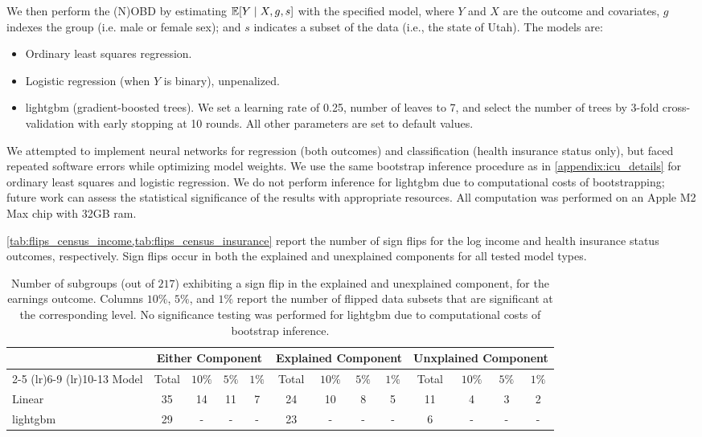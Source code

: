 We then perform the (N)OBD by estimating $\mathbb{E}[Y \mid X, g, s]$ with the specified model, 
where \( Y \) and \( X \) are the outcome and covariates, 
\( g \) indexes the group (i.e. male or female sex);
and \( s \) indicates a subset of the data (i.e., the state of Utah).
The models are:
\begin{itemize}
    \item Ordinary least squares regression.
    \item Logistic regression (when $Y$ is binary), unpenalized.
    \item lightgbm (gradient-boosted trees). We set a learning rate of 0.25, number of leaves to 7, and select the number of trees by 3-fold cross-validation with early stopping at 10 rounds. All other parameters are set to default values.
\end{itemize}
We attempted to implement neural networks for regression (both outcomes) and classification (health insurance status only), but faced repeated software errors while optimizing model weights.
We use the same bootstrap inference procedure as in \cref{appendix:icu_details} for ordinary least squares and logistic regression. 
We do not perform inference for lightgbm due to computational costs of bootstrapping; future work can assess the statistical significance of the results with appropriate resources.
All computation was performed on an Apple M2 Max chip with 32GB ram.

\cref{tab:flips_census_income,tab:flips_census_insurance} report the number of sign flips for the log income and health insurance status outcomes, respectively.
Sign flips occur in both the explained and unexplained components for all tested model types.

\begin{table}[!ht]
    \caption{Number of subgroups (out of $217$) exhibiting a sign flip in the explained and unexplained component, for the earnings outcome. Columns $10\%$, $5\%$, and $1\%$ report the number of flipped data subsets that are significant at the corresponding level. No significance testing was performed for lightgbm due to computational costs of bootstrap inference.}
    \label{tab:flips_census_income}
    \centering
    \small
    \begin{tabular}{l*{12}{c}}
    \toprule
          & \multicolumn{4}{c}{Either Component} & \multicolumn{4}{c}{Explained Component} & \multicolumn{4}{c}{Unxplained Component} \\
          \cmidrule(lr){2-5} \cmidrule(lr){6-9} \cmidrule(lr){10-13}
    Model       & Total & $10\%$ & $5\%$ & $1\%$ & Total & $10\%$ & $5\%$ & $1\%$ & Total & $10\%$ & $5\%$ & $1\%$ \\
    \midrule
    Linear      & 35 & 14 & 11 & 7 & 24 & 10 & 8 & 5 & 11 & 4 & 3 & 2 \\
    lightgbm    & 29 & -  & -  & - & 23 & -  & - & - & 6  & - & - & - \\
    \bottomrule
    \end{tabular}
\end{table}


